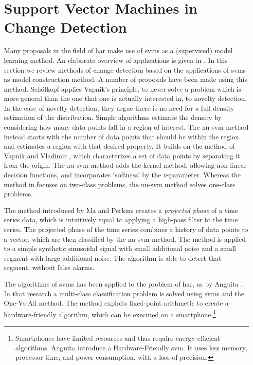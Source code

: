 \section{Support Vector Machines in Change Detection}\label{sec:literature_review_svm}

Many proposals in the field of \gls{har} make use of \glspl{svm} as a (supervised) model learning method.
An elaborate overview of applications is given in \cite{mountrakis2011support}.
In this section we review methods of change detection based on the applications of \glspl{svm} as model construction method.
A number of proposals have been made using this method.
Sch{\"o}lkopf \etal \cite{scholkopf1999support} applies Vapnik's principle, to never solve a problem which is more general than the one that one is actually interested in, to novelty detection.
In the case of novelty detection, they argue there is no need for a full density estimation of the distribution.
Simple algorithms estimate the density by considering how many data points fall in a region of interest.
The \gls{nu-svm} method instead starts with the number of data points that should be within the region and estimates a region with that desired property.
It builds on the method of Vapnik and Vladimir \cite{vapnik1963pattern}, which characterizes a set of data points by separating it from the origin.
The \gls{nu-svm} method adds the kernel method, allowing non-linear decision functions, and incorporates `softness' by the $\nu$-parameter.
Whereas the method in \cite{vapnik1963pattern} focuses on two-class problems, the \gls{nu-svm} method solves one-class problems.

The method introduced by Ma and Perkins \cite{ma2003time} creates a \emph{projected phase} of a time series data, which is intuitively equal to applying a high-pass filter to the time series.
The projected phase of the time series combines a history of data points to a vector, which are then classified by the \gls{nu-svm} method.
The method is applied to a simple synthetic sinusoidal signal with small additional noise and a small segment with large additional noise.
The algorithm is able to detect that segment, without false alarms.

The algorithms of \glspl{svm} has been applied to the problem of \gls{har}, as by Anguita \etal \cite{anguita2012human}.
In that research a multi-class classification problem is solved using \glspl{svm} and the One-Vs-All method.
The method exploits fixed-point arithmetic to create a hardware-friendly algorithm, which can be executed on a smartphone.\footnote{Smartphones have limited resources and thus require energy-efficient algorithms. Anguita \etal \cite{anguita2007hardware} introduce a Hardware-Friendly \gls{svm}. It uses less memory, processor time, and power consumption, with a loss of precision.}

